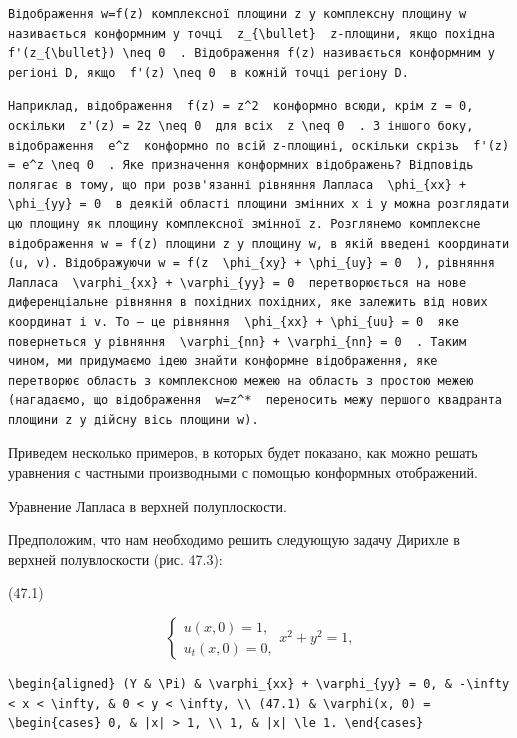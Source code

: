 \documentclass[
  ukrainian,
]{article}
\begin{document}
\begin{verbatim}
Відображення w=f(z) комплексної площини z у комплексну площину w називається конформним у точці  z_{\bullet}  z-площини, якщо похідна  f'(z_{\bullet}) \neq 0  . Відображення f(z) називається конформним у регіоні D, якщо  f'(z) \neq 0  в кожній точці регіону D.
\end{verbatim}

\begin{verbatim}
Наприклад, відображення  f(z) = z^2  конформно всюди, крім z = 0, оскільки  z'(z) = 2z \neq 0  для всіх  z \neq 0  . З іншого боку, відображення  e^z  конформно по всій z-площині, оскільки скрізь  f'(z) = e^z \neq 0  . Яке призначення конформних відображень? Відповідь полягає в тому, що при розв'язанні рівняння Лапласа  \phi_{xx} + \phi_{yy} = 0  в деякій області площини змінних x і y можна розглядати цю площину як площину комплексної змінної z. Розглянемо комплексне відображення w = f(z) площини z у площину w, в якій введені координати (u, v). Відображуючи w = f(z  \phi_{xy} + \phi_{uy} = 0  ), рівняння Лапласа  \varphi_{xx} + \varphi_{yy} = 0  перетворюється на нове диференціальне рівняння в похідних похідних, яке залежить від нових координат і v. To — це рівняння  \phi_{xx} + \phi_{uu} = 0  яке повернеться у рівняння  \varphi_{nn} + \varphi_{nn} = 0  . Таким чином, ми придумаємо ідею знайти конформне відображення, яке перетворює область з комплексною межею на область з простою межею (нагадаємо, що відображення  w=z^*  переносить межу першого квадранта площини z у дійсну вісь площини w).
\end{verbatim}

Приведем несколько примеров, в которых будет показано, как можно решать
уравнения с частными производными с помощью конформных отображений.

Уравнение Лапласа в верхней полуплоскости.

Предположим, что нам необходимо решить следующую задачу Дирихле в
верхней полувлоскости (рис. 47.3):

(47.1)

\[
\begin{cases} u(x, 0) = 1, \\ u_t(x, 0) = 0, \end{cases}
x^{2} + y^{2} = 1,
\]

\begin{verbatim}
\begin{aligned} (Y & \Pi) & \varphi_{xx} + \varphi_{yy} = 0, & -\infty < x < \infty, & 0 < y < \infty, \\ (47.1) & \varphi(x, 0) = \begin{cases} 0, & |x| > 1, \\ 1, & |x| \le 1. \end{cases}
\end{verbatim}
\end{document}
